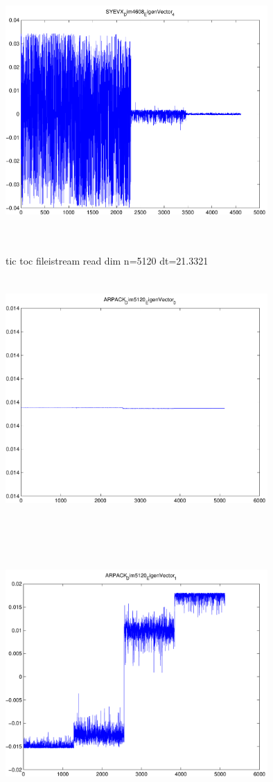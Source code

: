 \documentclass[9pt]{article}
\theoremstyle{plain}
\theoremstyle{definition}
\theoremstyle{remark}
\numberwithin{equation}{section}
\begin{document}
\includegraphics[width=10.0cm,height=10.0cm]{SYEVX_Dim4608_EigenVector_4.pdf}

tic toc fileistream read dim n=5120 dt=21.3321
\includegraphics[width=10.0cm,height=10.0cm]{ARPACK_Dim5120_EigenVector_0.pdf}

\includegraphics[width=10.0cm,height=10.0cm]{ARPACK_Dim5120_EigenVector_1.pdf}
\end{document}
